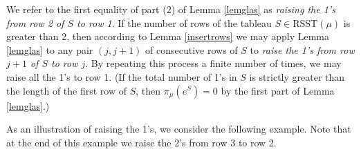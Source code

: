 \documentclass[11pt]{amsart}
\theoremstyle{definition}
\numberwithin{equation}{section}
\begin{document}
We refer to the first equality of part (2) of Lemma \ref{lemglas} as \textit{raising the 1's from  row 2 of $S$ to row 1}. If the number of rows of the tableau $S \in \mathrm{RSST}(\mu)$ is greater than 2, then according to Lemma \ref{insertrows} we may apply Lemma \ref{lemglas} to any pair $(j,j+1)$ of consecutive rows of $S$ to \textit{raise the 1's from row $j+1$ of $S$ to row $j$}. By repeating this process a finite number of times, we may raise all the 1's to  row 1. (If the total number of 1's in $S$ is strictly greater than the length of the first row of $S$, then $\pi_\mu(e^S)=0$ by the first part of Lemma \ref{lemglas}.)

As an illustration of raising the 1's, we consider the following example. Note that at the end of this example we raise the 2's from row 3 to row 2.
\end{document}

